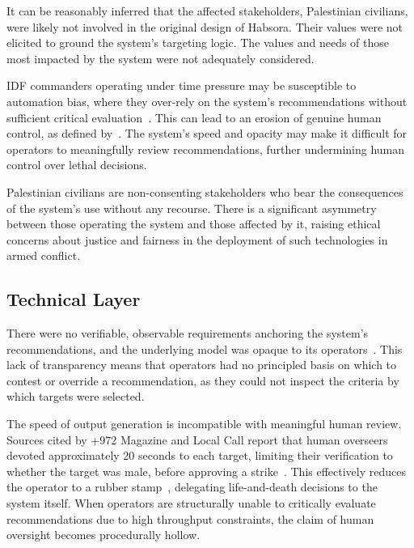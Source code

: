 It can be reasonably inferred that the affected stakeholders, Palestinian civilians, were likely not involved in the original design of Habsora. Their values were not elicited to ground the system's targeting logic. The values and needs of those most impacted by the system were not adequately considered.

IDF commanders operating under time pressure may be susceptible to automation bias, where they over-rely on the system's recommendations without sufficient critical evaluation~\citep{parasuraman2010complacency}. This can lead to an erosion of genuine human control, as defined by~\citet{mhcof}. The system's speed and opacity may make it difficult for operators to meaningfully review recommendations, further undermining human control over lethal decisions.

Palestinian civilians are non-consenting stakeholders who bear the consequences of the system's use without any recourse. There is a significant asymmetry between those operating the system and those affected by it, raising ethical concerns about justice and fairness in the deployment of such technologies in armed conflict.

\subsection{Technical Layer}

There were no verifiable, observable requirements anchoring the system's recommendations, and the underlying model was opaque to its operators~\citep{abraham_2024}. This lack of transparency means that operators had no principled basis on which to contest or override a recommendation, as they could not inspect the criteria by which targets were selected.

The speed of output generation is incompatible with meaningful human review. Sources cited by +972 Magazine and Local Call report that human overseers devoted approximately 20 seconds to each target, limiting their verification to whether the target was male, before approving a strike~\citep{abraham_2024}. This effectively reduces the operator to a rubber stamp~\citep{kozlovski2024algorithms}, delegating life-and-death decisions to the system itself. When operators are structurally unable to critically evaluate recommendations due to high throughput constraints, the claim of human oversight becomes procedurally hollow.

